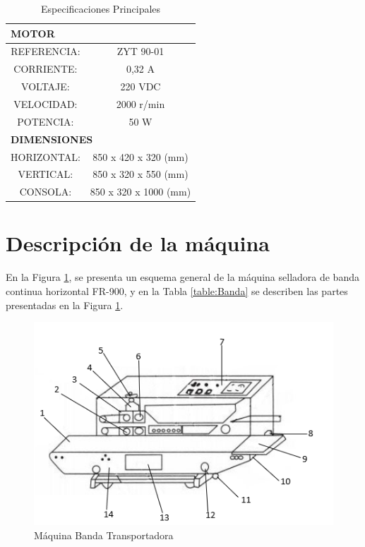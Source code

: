 \begin{table}[ht]
	\centering
	\begin{tabular}{|c|c|c|c|}
		\hline
		\multicolumn{4}{|l|}{\textbf{MOTOR}} \bigstrut\\
		\hline
		\multicolumn{2}{|c|}{REFERENCIA:} & \multicolumn{2}{c|}{ZYT 90-01} \bigstrut\\
		\hline
		\multicolumn{2}{|c|}{CORRIENTE:} & \multicolumn{2}{c|}{0,32 A} \bigstrut\\
		\hline
		\multicolumn{2}{|c|}{VOLTAJE:} & \multicolumn{2}{c|}{220 VDC} \bigstrut\\
		\hline
		\multicolumn{2}{|c|}{VELOCIDAD:} & \multicolumn{2}{c|}{2000 r/min} \bigstrut\\
		\hline
		\multicolumn{2}{|c|}{POTENCIA:} & \multicolumn{2}{c|}{50 W} \bigstrut\\
		\hline
		\multicolumn{4}{|l|}{\textbf{DIMENSIONES}} \bigstrut\\
		\hline
		\multicolumn{2}{|c|}{HORIZONTAL:} & \multicolumn{2}{c|}{850 x 420 x 320 (mm)} \bigstrut\\
		\hline
		\multicolumn{2}{|c|}{VERTICAL:} & \multicolumn{2}{c|}{850 x 320 x 550 (mm)} \bigstrut\\
		\hline
		\multicolumn{2}{|c|}{CONSOLA:} & \multicolumn{2}{c|}{850 x 320 x 1000 (mm)} \bigstrut\\
		\hline
	\end{tabular}%
	\caption{Especificaciones Principales}
	\label{fig:principales}
\end{table}%


\newpage
\section{Descripción de la máquina}
En la Figura \ref{fig:Banda}, se presenta un esquema general de la máquina selladora de banda continua horizontal FR-900, y en la Tabla \ref{table:Banda} se describen las partes presentadas en la Figura \ref{fig:Banda}.
\begin{figure}[ht]
	\centering
	\includegraphics[scale=0.95]{Figs/65.png}
	\caption{Máquina Banda Transportadora}
	\label{fig:Banda}
\end{figure}


